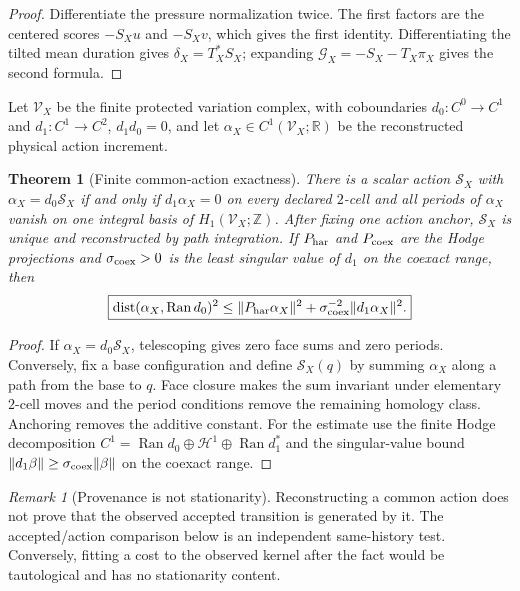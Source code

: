 \documentclass[11pt]{article}
\newtheorem{theorem}{Theorem}[section]
\theoremstyle{definition}
\theoremstyle{remark}
\newtheorem{remark}[remark]{Remark}
\newcommand{\Z}{\mathbb Z}
\newcommand{\R}{\mathbb R}
\newcommand{\Ran}{\operatorname{Ran}}
\begin{document}
\begin{proof}
Differentiate the pressure normalization twice.  The first factors are the
centered scores $-S_Xu$ and $-S_Xv$, which gives the first identity.
Differentiating the tilted mean duration gives $\delta_X=T_X^*S_X$; expanding
$\mathscr G_X=-S_X-T_X\pi_X$ gives the second formula.
\end{proof}

Let $\mathscr V_X$ be the finite protected variation complex, with coboundaries
$d_0:C^0\to C^1$ and $d_1:C^1\to C^2$, $d_1d_0=0$, and let
$\alpha_X\in C^1(\mathscr V_X;\R)$ be the reconstructed physical action
increment.

\begin{theorem}[Finite common-action exactness]
\label{thm:supp-common-action}
There is a scalar action $\mathscr S_X$ with $\alpha_X=d_0\mathscr S_X$ if and
only if $d_1\alpha_X=0$ on every declared $2$-cell and all periods of
$\alpha_X$ vanish on one integral basis of $H_1(\mathscr V_X;\Z)$.  After fixing
one action anchor, $\mathscr S_X$ is unique and reconstructed by path
integration.  If $P_{\rm har}$ and $P_{\rm coex}$ are the Hodge projections and
$\sigma_{\rm coex}>0$ is the least singular value of $d_1$ on the coexact
range, then
\begin{equation}
 \boxed{
 \operatorname{dist}(\alpha_X,\Ran d_0)^2
 \le\|P_{\rm har}\alpha_X\|^2
 +\sigma_{\rm coex}^{-2}\|d_1\alpha_X\|^2.}
 \label{eq:supp-common-action-distance}
\end{equation}
\end{theorem}

\begin{proof}
If $\alpha_X=d_0\mathscr S_X$, telescoping gives zero face sums and zero periods.
Conversely, fix a base configuration and define $\mathscr S_X(q)$ by summing
$\alpha_X$ along a path from the base to $q$.  Face closure makes the sum
invariant under elementary $2$-cell moves and the period conditions remove the
remaining homology class.  Anchoring removes the additive constant.  For the
estimate use the finite Hodge decomposition
$C^1=\Ran d_0\oplus\mathcal H^1\oplus\Ran d_1^*$ and the singular-value bound
$\|d_1\beta\|\ge\sigma_{\rm coex}\|\beta\|$ on the coexact range.
\end{proof}

\begin{remark}[Provenance is not stationarity]
Reconstructing a common action does not prove that the observed accepted
transition is generated by it.  The accepted/action comparison below is an
independent same-history test.  Conversely, fitting a cost to the observed
kernel after the fact would be tautological and has no stationarity content.
\end{remark}
\end{document}
